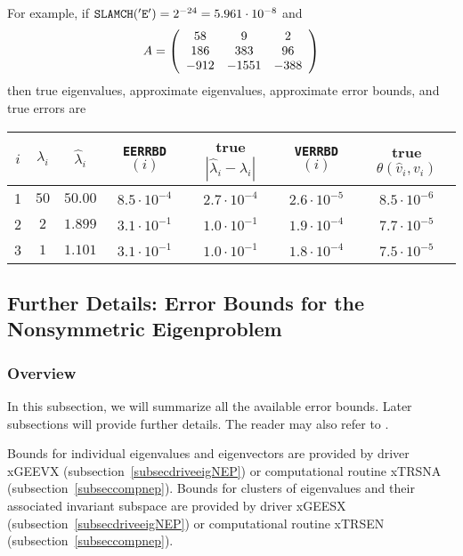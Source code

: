 For example, if
${\tt SLAMCH('E')} = 2^{-24} = 5.961 \cdot 10^{-8}$ and
\[
A = \bmat{ccc} 58 & 9 & 2 \\ 186 & 383 & 96 \\ -912 & -1551 & -388 \emat
\]
then true eigenvalues, approximate eigenvalues, approximate error bounds,
and true errors are
\begin{center}
\begin{tabular}{||c|c|c||c|c||c|c||}
\hline
$i$ & $\lambda_i$ & $\hat{\lambda}_i$ &
{\tt EERRBD}$(i)$ & true $| \hat{\lambda}_i - \lambda_i |$ &
{\tt VERRBD}$(i)$ & true $\theta ( \hat{v}_i , v_i )$ \\ \hline
1 & $50$ & $50.00$ & $8.5 \cdot 10^{-4}$ & $2.7 \cdot 10^{-4}$ &
$2.6 \cdot 10^{-5}$ & $8.5 \cdot 10^{-6}$ \\
2 & $2$ & $1.899$ & $3.1 \cdot 10^{-1}$ & $1.0 \cdot 10^{-1}$ &
$1.9 \cdot 10^{-4}$ & $7.7 \cdot 10^{-5}$ \\
3 & $1$ & $1.101$ & $3.1 \cdot 10^{-1}$ & $1.0 \cdot 10^{-1}$ &
$1.8 \cdot 10^{-4}$ & $7.5 \cdot 10^{-5}$ \\ \hline
\end{tabular}
\end{center}

\subsection{Further Details:  Error Bounds for the Nonsymmetric Eigenproblem}
\subsubsection{Overview}\label{secnepsummary}

In this subsection, we will summarize all the available error bounds.
Later subsections will provide further details. The reader may also
refer to \cite{baidemmelmckenney,stewartsun90}.

Bounds for individual eigenvalues and eigenvectors are provided by
driver xGEEVX (subsection~\ref{subsecdriveeigNEP}) or computational
routine xTRSNA (subsection~\ref{subseccompnep}).
Bounds for
clusters of eigenvalues
and their associated invariant subspace are
provided by driver xGEESX (subsection~\ref{subsecdriveeigNEP}) or
computational routine xTRSEN (subsection~\ref{subseccompnep}).

